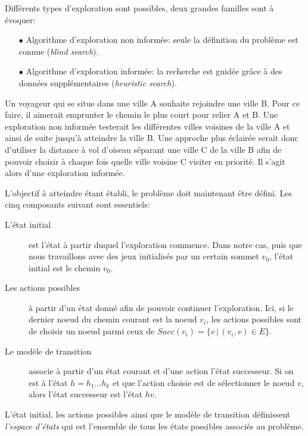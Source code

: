 Différents types d'exploration sont possibles, deux grandes familles sont à évoquer:

\begin{itemize}
	\item[$\bullet$] Algorithme d'exploration non informée: seule la définition du problème est connue (\emph{blind search}).
	\item[$\bullet$] Algorithme d'exploration informée: la recherche est guidée grâce à des données supplémentaires (\emph{heuristic search}).
\end{itemize}

\begin{exemple}
	Un voyageur qui se situe dans une ville A souhaite rejoindre une ville B. Pour ce faire, il aimerait emprunter le chemin le plus court pour relier A et B. Une exploration non informée testerait les différentes villes voisines de la ville A et ainsi de suite jusqu'à atteindre la ville B. Une approche plus éclairée serait donc d'utiliser la distance à vol d'oiseau séparant une ville C de la ville B afin de pouvoir choisir à chaque fois quelle ville voisine C visiter en priorité. Il s'agit alors d'une exploration informée.
\end{exemple}

L'objectif à atteindre étant établi, le problème doit maintenant être défini. Les cinq composants suivant sont essentiels:

\begin{description}
	\item[L'état initial] est l'état à partir duquel l'exploration commence. Dans notre cas, puis que nous travaillons avec des jeux initialisés par un certain sommet $v_0$, l'état initial est le chemin $v_0$.
	\item[Les actions possibles] à partir d'un état donné afin de pouvoir continuer l'exploration. Ici, si le dernier noeud du chemin courant est la noeud $v_i$, les actions possibles sont de choisir un noeud parmi ceux de $Succ(v_i) = \{ v\, |\, (v_i, v) \in E \}.$
	\item[Le modèle de transition] associe à partir d'un état courant et d'une action l'état successeur. Si on est à l'état $h = h_1 ... h_k$ et que l'action choisie est de sélectionner le noeud $v$, alors l'état successeur est l'état $hv$.
\end{description}

L'état initial, les actions possibles ainsi que le modèle de transition définissent \emph{l'espace d'états} qui est l'ensemble de tous les états possibles associés au problème.

